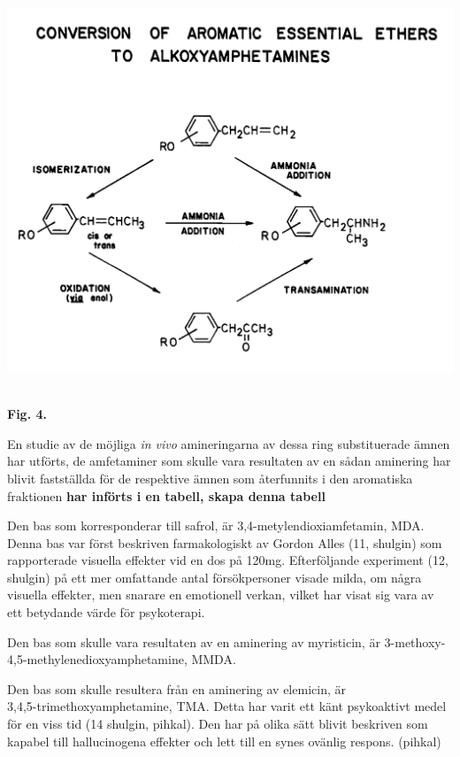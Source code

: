 \documentclass[a4paper,margin=3.25cm]{article}
\begin{document}
{	\hbox{\hspace{0cm}\includegraphics[scale=0.1125]{Figure4}
	}
	\begin{center}\textbf{Fig. 4.}\end{center}


	En studie av de möjliga \textit{in vivo} amineringarna av dessa ring substituerade
	ämnen har utförts, de amfetaminer som skulle vara resultaten av en sådan
	aminering har blivit fastställda för de respektive ämnen som återfunnits
	i den aromatiska fraktionen \textbf{har införts i en tabell, skapa denna tabell}

	Den bas som korresponderar till safrol, är 3,4-metylendioxiamfetamin, MDA.
	Denna bas var först beskriven farmakologiskt av Gordon Alles (11, shulgin) som
	rapporterade visuella effekter vid en dos på 120mg. Efterföljande experiment
	(12, shulgin) på ett mer omfattande antal försökpersoner visade milda, om några
	visuella effekter, men snarare en emotionell verkan, vilket har visat sig
	vara av ett betydande värde för psykoterapi.

	Den bas som skulle vara resultaten av en aminering av myristicin, är
	3-methoxy-4,5-methylenedioxyamphetamine, MMDA.

	Den bas som skulle resultera från en aminering av elemicin, är \\
	3,4,5-trimethoxyamphetamine, TMA. Detta har varit ett känt psykoaktivt medel
	för en viss tid (14 shulgin, pihkal).
	Den har på olika sätt blivit beskriven som kapabel till hallucinogena effekter
	och lett till en synes ovänlig respons. (pihkal)

}
\end{document}
